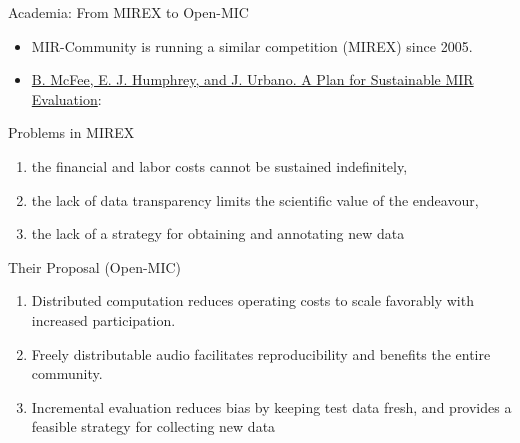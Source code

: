 \documentclass{beamer}
\begin{document}
\begin{frame}{Academia: From MIREX to Open-MIC}

\begin{itemize}
\item MIR-Community is running a similar competition (MIREX) since 2005. 
\item \href{https://github.com/cosmir/open-mic}{B. McFee, E. J. Humphrey, and
J. Urbano. A Plan for Sustainable MIR Evaluation}:
\end{itemize}
\end{frame}

\begin{frame}{Problems in MIREX}

\begin{enumerate}
\def\labelenumi{\arabic{enumi}.}

\item
  the financial and labor costs cannot be sustained indefinitely,
\item
  the lack of data transparency limits the scientific value of the
  endeavour,
\item
  the lack of a strategy for obtaining and annotating new data
\end{enumerate}

\end{frame}

\begin{frame}{Their Proposal (Open-MIC)}

\begin{enumerate}
\def\labelenumi{\arabic{enumi}.}

\item
  Distributed computation reduces operating costs to scale favorably
  with increased participation.
\item
  Freely distributable audio facilitates reproducibility and benefits
  the entire community.
\item
  Incremental evaluation reduces bias by keeping test data fresh, and
  provides a feasible strategy for collecting new data
\end{enumerate}

\end{frame}



\end{document}
